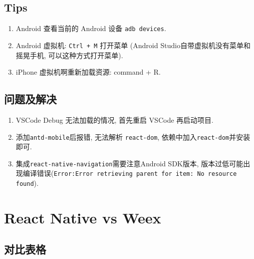 \subsection{Tips}\label{tips}

\begin{enumerate}
\def\labelenumi{\arabic{enumi}.}
\tightlist
\item
  Android 查看当前的 Android 设备 \lstinline!adb devices!.
\item
  Android 虚拟机: \lstinline!Ctrl + M! 打开菜单 (Android
  Studio自带虚拟机没有菜单和摇晃手机, 可以这种方式打开菜单).
\item
  iPhone 虚拟机啊重新加载资源: command + R.
\end{enumerate}

\subsection{问题及解决}\label{ux95eeux9898ux53caux89e3ux51b3}

\begin{enumerate}
\def\labelenumi{\arabic{enumi}.}
\tightlist
\item
  VSCode Debug 无法加载的情况, 首先重启 VSCode 再启动项目.
\item
  添加\lstinline!antd-mobile!后报错, 无法解析 \lstinline!react-dom!,
  依赖中加入\lstinline!react-dom!并安装即可.
\item
  集成\lstinline!react-native-navigation!需要注意Android SDK版本,
  版本过低可能出现编译错误(\lstinline!Error:Error retrieving parent for item: No resource found!).
\end{enumerate}

\section{React Native vs Weex}\label{react-native-vs-weex}

\subsection{对比表格}\label{ux5bf9ux6bd4ux8868ux683c}

